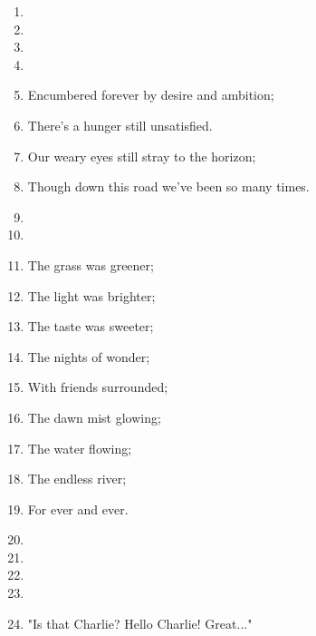 \documentclass{article}
\begin{document}
\begin{center}
\begin{enumerate}
            \item[]
            \item[] \instrumental

            \item[]
            \item[] 
            \item Encumbered forever by desire and ambition;
            \item There's a hunger still unsatisfied.
            \item Our weary eyes still stray to the horizon;
            \item Though down this road we've been so many times.
            
            \item[]
            \item[] \chorus
            \item The grass was greener;
            \item The light was brighter;
            \item The taste was sweeter;
            \item The nights of wonder;
            \item With friends surrounded;
            \item The dawn mist glowing;
            \item The water flowing;
            \item The endless river;
            \item For ever and ever.

            \item[]
            \item[] \instrumental

            \item[]
            \item[] \outro

            \item "Is that Charlie? Hello Charlie! Great..."

        \end{enumerate}
    \end{center}
\end{document}
